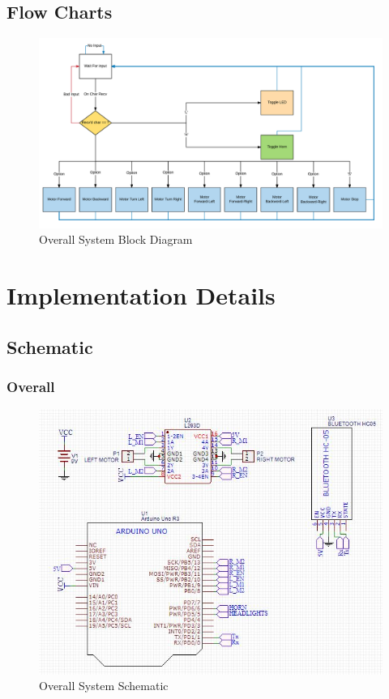 \documentclass{article}
\begin{document}
	\subsection*{Flow Charts}
	\begin{figure}[H]
		\centering
		\includegraphics[scale=0.15]{FD}
		\caption{Overall System Block Diagram}
	\end{figure}
	\section*{Implementation Details}
	\subsection*{Schematic}
	\subsubsection*{Overall}
	\begin{figure}[H]
		\centering
		\includegraphics[scale=1.0]{overview}
		\caption{Overall System Schematic}
	\end{figure}
\end{document}
